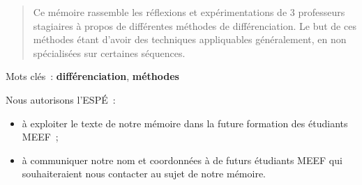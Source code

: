 \begin{abstract}
Ce mémoire rassemble les réflexions et expérimentations de 3 professeurs stagiaires
à propos de différentes méthodes de différenciation. Le but de ces méthodes
étant d'avoir des techniques appliquables généralement, en non spécialisées sur
certaines séquences.
\end{abstract}

Mots clés : \textbf{différenciation}, \textbf{méthodes}

Nous autorisons l'ESPÉ :
\begin{itemize}
\item à exploiter le texte de notre mémoire dans la future formation des étudiants MEEF ;
\item à communiquer notre nom et coordonnées à de futurs étudiants MEEF qui souhaiteraient
nous contacter au sujet de notre mémoire.
\end{itemize}
